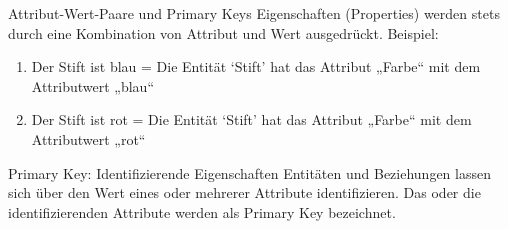 \begin{frame}{Attribut-Wert-Paare und Primary Keys}
    Eigenschaften (Properties) werden stets durch eine Kombination von Attribut und Wert ausgedrückt. Beispiel: 
    \begin{enumerate}
        \item Der Stift ist blau = Die Entität `Stift' hat das Attribut „Farbe“ mit dem Attributwert „blau“ 
        \item Der Stift ist rot = Die Entität `Stift' hat das Attribut „Farbe“ mit dem Attributwert „rot“
    \end{enumerate}

\begin{exampleblock}{Primary Key: Identifizierende Eigenschaften}
Entitäten und Beziehungen lassen sich über den Wert eines oder mehrerer Attribute identifizieren. 
Das oder die identifizierenden Attribute werden als Primary Key bezeichnet.
\end{exampleblock}
\end{frame}
